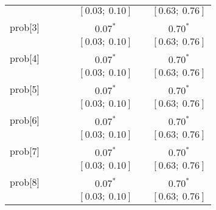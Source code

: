 \begin{table}
\begin{center}
\begin{tabular}{l c c c c c c }
          &                           &                           &                           & $[0.03;\ 0.10]$         &                           & $[0.63;\ 0.76]$       \\
prob[3]   &                           &                           &                           & $0.07^{*}$              &                           & $0.70^{*}$            \\
          &                           &                           &                           & $[0.03;\ 0.10]$         &                           & $[0.63;\ 0.76]$       \\
prob[4]   &                           &                           &                           & $0.07^{*}$              &                           & $0.70^{*}$            \\
          &                           &                           &                           & $[0.03;\ 0.10]$         &                           & $[0.63;\ 0.76]$       \\
prob[5]   &                           &                           &                           & $0.07^{*}$              &                           & $0.70^{*}$            \\
          &                           &                           &                           & $[0.03;\ 0.10]$         &                           & $[0.63;\ 0.76]$       \\
prob[6]   &                           &                           &                           & $0.07^{*}$              &                           & $0.70^{*}$            \\
          &                           &                           &                           & $[0.03;\ 0.10]$         &                           & $[0.63;\ 0.76]$       \\
prob[7]   &                           &                           &                           & $0.07^{*}$              &                           & $0.70^{*}$            \\
          &                           &                           &                           & $[0.03;\ 0.10]$         &                           & $[0.63;\ 0.76]$       \\
prob[8]   &                           &                           &                           & $0.07^{*}$              &                           & $0.70^{*}$            \\
          &                           &                           &                           & $[0.03;\ 0.10]$         &                           & $[0.63;\ 0.76]$       \\

\end{tabular}
\end{center}
\end{table}
